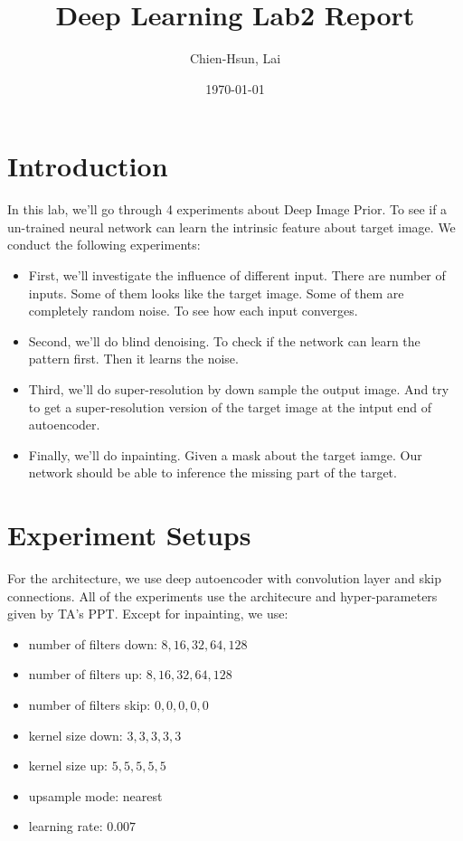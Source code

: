 \documentclass[A4]{article}
\title{Deep Learning Lab2 Report}
\author{Chien-Hsun, Lai}
\date{\today}
\begin{document}
\maketitle

\section{Introduction}
In this lab, we'll go through 4 experiments about Deep Image Prior.
To see if a un-trained neural network can learn the intrinsic feature about target image.
We conduct the following experiments:
\begin{itemize}
	\item {First, we'll investigate the influence of different input.
	There are number of inputs. Some of them looks like the target image.
	Some of them are completely random noise.
	To see how each input converges.}
	\item {Second, we'll do blind denoising. To check if the network can learn the pattern first. Then it learns the noise.}
	\item {Third, we'll do super-resolution by down sample the output image.
	And try to get a super-resolution version of the target image at the intput end of autoencoder.}
	\item {Finally, we'll do inpainting. Given a mask about the target iamge.
	Our network should be able to inference the missing part of the target.}
\end{itemize}

\section{Experiment Setups}
For the architecture, we use deep autoencoder with convolution layer and skip connections.
All of the experiments use the architecure and hyper-parameters given by TA's PPT.
Except for inpainting, we use:
\begin{itemize}
	\item {number of filters down: $ 8, 16, 32, 64, 128 $ }
	\item {number of filters up: $ 8, 16, 32, 64, 128 $ }
	\item {number of filters skip: $ 0, 0, 0, 0, 0 $ }
	\item {kernel size down: $ 3, 3, 3, 3, 3 $ }
	\item {kernel size up: $ 5, 5, 5, 5, 5 $ }
	\item {upsample mode: nearest}
	\item {learning rate: $ 0.007 $}
\end{itemize}
\end{document}
